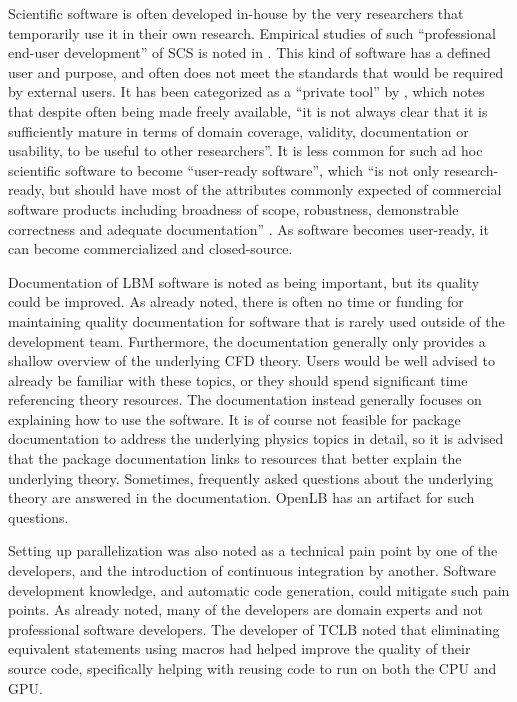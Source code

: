 \documentclass[12pt, notitlepage]{article}
\begin{document}
Scientific software is often developed in-house by the very researchers that temporarily use it in their own research. Empirical studies of such ``professional end-user development'' of SCS is noted in \citep{segal2007end}. This kind of software has a defined user and purpose, and often does not meet the standards that would be required by external users. It has been categorized as a ``private tool'' by \citep{gewaltig2012quality}, which notes that despite often being made freely available, ``it is not always clear that it is sufficiently mature in terms of domain coverage, validity, documentation or usability, to be useful to other researchers''. It is less common for such ad hoc scientific software to become ``user-ready software'', which ``is not only research-ready, but should have most of the attributes commonly expected of commercial software products including broadness of scope, robustness, demonstrable correctness and adequate documentation'' \citep{gewaltig2012quality}. As software becomes user-ready, it can become commercialized and closed-source. 

Documentation of LBM software is noted as being important, but its quality could be improved. As already noted, there is often no time or funding for maintaining quality documentation for software that is rarely used outside of the development team. Furthermore, the documentation generally only provides a shallow overview of the underlying CFD theory. Users would be well advised to already be familiar with these topics, or they should spend significant time referencing theory resources. The documentation instead generally focuses on explaining how to use the software. It is of course not feasible for package documentation to address the underlying physics topics in detail, so it is advised that the package documentation links to resources that better explain the underlying theory. Sometimes, frequently asked questions about the underlying theory are answered in the documentation. OpenLB has an artifact for such questions.

Setting up parallelization was also noted as a technical pain point by one of the developers, and the introduction of continuous integration by another. Software development knowledge, and automatic code generation, could mitigate such pain points. As already noted, many of the developers are domain experts and not professional software developers. The developer of TCLB noted that eliminating equivalent statements using macros had helped improve the quality of their source code, specifically helping with reusing code to run on both the CPU and GPU. 
\end{document}
